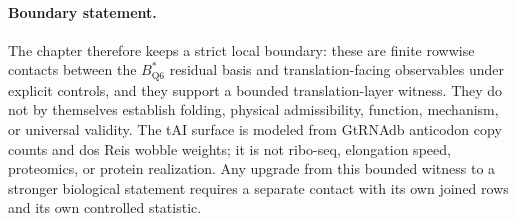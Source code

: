 \paragraph{Boundary statement.}
The chapter therefore keeps a strict local boundary: these are finite rowwise contacts between the $B^\ast_{\mathrm{Q6}}$ residual basis and translation-facing observables under explicit controls, and they support a bounded translation-layer witness. They do not by themselves establish folding, physical admissibility, function, mechanism, or universal validity. The tAI surface is modeled from GtRNAdb anticodon copy counts and dos Reis wobble weights; it is not ribo-seq, elongation speed, proteomics, or protein realization. Any upgrade from this bounded witness to a stronger biological statement requires a separate contact with its own joined rows and its own controlled statistic.


